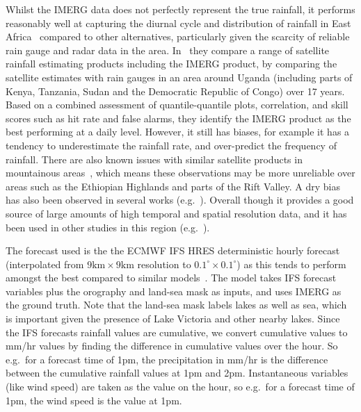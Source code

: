 \documentclass{article}
\begin{document}
Whilst the IMERG data does not perfectly represent the true rainfall, it performs reasonably well at capturing the diurnal cycle and distribution of rainfall in East Africa~\citep{dezfuli_validation_2017, roca_comparing_2010, camberlin_major_2018} compared to other alternatives, particularly given the scarcity of reliable rain gauge and radar data in the area.  In~\cite{ageet_validation_2022} they compare a range of satellite rainfall estimating products including the IMERG product, by comparing the satellite estimates with rain gauges in an area around Uganda (including parts of Kenya, Tanzania, Sudan and the Democratic Republic of Congo) over 17 years. Based on a combined assessment of quantile-quantile plots, correlation, and skill scores such as hit rate and false alarms, they identify the IMERG product as the best performing at a daily level. However, it still has biases, for example it has a tendency to underestimate the rainfall rate, and over-predict the frequency of rainfall. There are also known issues with similar satellite products in mountainous areas~\citep{dinku_comparison_2010}, which means these observations may be more unreliable over areas such as the Ethiopian Highlands and parts of the Rift Valley. A dry bias has also been observed in several works (e.g.~\cite{vogel_skill_2018}). Overall though it provides a good source of large amounts of high temporal and spatial resolution data, and it has been used in other studies in this region (e.g.~\cite{woodhams_what_2018, finney_implications_2019, cafaro_convection-permitting_2021}).

The forecast used is the the ECMWF IFS HRES deterministic hourly forecast~\citep{ecmwf_operational_2023} (interpolated from $9\text{km} \times 9\text{km}$ resolution to $0.1^{\circ} \times 0.1^{\circ}$) as this tends to perform amongst the best compared to similar models~\citep{haiden_intercomparison_2012}. The model takes IFS forecast variables plus the orography and land-sea mask as inputs, and uses IMERG as the ground truth. Note that the land-sea mask labels lakes as well as sea, which is important given the presence of Lake Victoria and other nearby lakes. Since the IFS forecasts rainfall values are cumulative, we convert cumulative values to mm/hr values by finding the difference in cumulative values over the hour. So e.g.~for a forecast time of 1pm, the precipitation in mm/hr is the difference between the cumulative rainfall values at 1pm and 2pm. Instantaneous variables (like wind speed) are taken as the value on the hour, so e.g.~for a forecast time of 1pm, the wind speed is the value at 1pm. 
\end{document}

